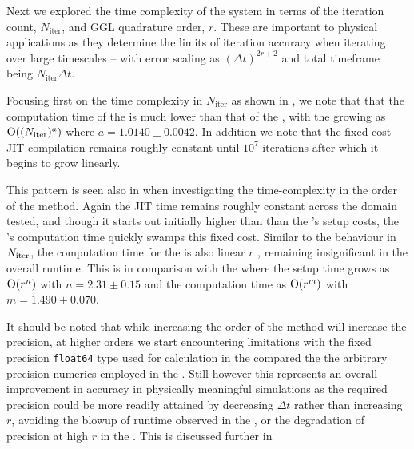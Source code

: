 Next we explored the time complexity of the system in terms of the iteration count, $N_{\text{iter}}$, and GGL quadrature order, $r$. These are important to physical applications as they determine the limits of iteration accuracy when iterating over large timescales -- with error scaling as $(\Delta t)^{2r + 2}$ and total timeframe being $N_{\text{iter}} \Delta t$.

Focusing first on the time complexity in $N_{\text{iter}}$ as shown in , we note that that the computation time of the \updimpl{} is much lower than that of the \orgimpl{}, with the \updimpl{} growing as $\mathord{\mathrm{O}}((N_{\mathrm{iter}})^a)$ where $a = 1.0140 \pm 0.0042$. 
In addition we note that the fixed cost JIT compilation remains roughly constant until $10^7$ iterations after which it begins to grow linearly.

This pattern is seen also in  when investigating the time-complexity in the order of the method. Again the JIT time remains roughly constant across the domain tested, and though it starts out initially higher than than the \orgimpl{}'s setup costs, the \orgimpl{}'s computation time quickly swamps this fixed cost.
Similar to the behaviour in $N_{\mathrm{iter}}$, the computation time for the \updimpl{} is also linear $r$ , remaining insignificant in the overall runtime. This is in comparison with the \orgimpl{} where the setup time grows as $\mathord{\mathrm{O}}(r^n)$ with $n = {2.31 \pm 0.15}$ and the computation time as $\mathord{\mathrm{O}}(r^m)$ with $m={1.490 \pm 0.070}$.


It should be noted that while increasing the order of the method will increase the precision, at higher orders we start encountering limitations with the fixed precision \texttt{float64} type used for calculation in the \updimpl{} compared the the arbitrary precision numerics employed in the \orgimpl{}.
Still however this represents an overall improvement in accuracy in physically meaningful simulations as the required precision could be more readily attained by decreasing $\Delta t$ rather than increasing $r$, avoiding the blowup of runtime observed in the \orgimpl{}, or the degradation of precision at high $r$ in the \updimpl{}. This is discussed further in 



